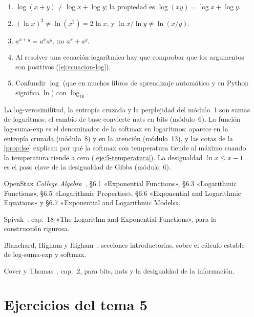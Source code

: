 \begin{observacion}
\begin{enumerate}[label=(\alph*)]
\item $\log(x+y)\neq\log x+\log y$; la propiedad es $\log(xy)=\log x+\log y$.
\item $(\ln x)^2\neq\ln(x^2)=2\ln x$, y $\ln x/\ln y\neq\ln(x/y)$.
\item $a^{x+y}=a^xa^y$, no $a^x+a^y$.
\item Al resolver una ecuación logarítmica hay que comprobar que los argumentos son positivos (\cref{ej:ecuacion-log}).
\item Confundir $\log$ (que en muchos libros de aprendizaje automático y en Python significa $\ln$) con $\log_{10}$.
\end{enumerate}
\end{observacion}

\begin{observacion}
La log-verosimilitud, la entropía cruzada y la perplejidad del módulo~1 son sumas de logaritmos; el cambio de base convierte nats en bits (módulo~6). La función log-suma-exp es el denominador de la softmax en logaritmos: aparece en la entropía cruzada (módulo~8) y en la atención (módulo~13), y las cotas de la \cref{prop:lse} explican por qué la softmax con temperatura tiende al máximo cuando la temperatura tiende a cero (\cref{eje:5-temperatura}). La desigualdad $\ln x\le x-1$ es el paso clave de la desigualdad de Gibbs (módulo~6).
\end{observacion}

\begin{lecturas}
\item OpenStax \emph{College Algebra}~\cite{openstax}, §6.1 «Exponential Functions», §6.3 «Logarithmic Functions», §6.5 «Logarithmic Properties», §6.6 «Exponential and Logarithmic Equations» y §6.7 «Exponential and Logarithmic Models».
\item Spivak~\cite{spivak}, cap.~18 «The Logarithm and Exponential Functions», para la construcción rigurosa.
\item Blanchard, Higham y Higham~\cite{blanchard}, secciones introductorias, sobre el cálculo estable de log-suma-exp y softmax.
\item Cover y Thomas~\cite{ct}, cap.~2, para bits, nats y la desigualdad de la información.
\end{lecturas}

\section*{Ejercicios del tema 5}

